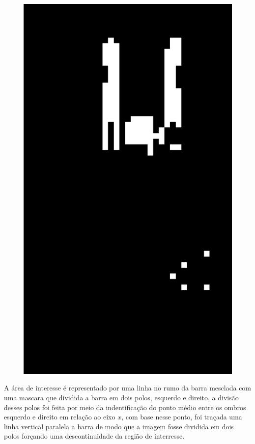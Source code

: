 \begin{figure}[H]
\begin{minipage}{\sizeImg\textwidth}
            \includegraphics[width=\textwidth]{figuras/mao_barra/limited3.png}
        \end{minipage}
    \label{fig:pixeled}
\end{figure}


A área de interesse é representado por uma linha no rumo da barra mesclada com uma mascara que dividida a barra em dois polos, esquerdo e direito, a divisão desses polos foi feita por meio da indentificação do ponto médio entre os ombros esquerdo e direito em relação ao eixo $x$, com base nesse ponto, foi traçada uma linha vertical paralela a barra de modo que a imagem fosse dividida em dois polos forçando uma descontinuidade da região de interresse.


